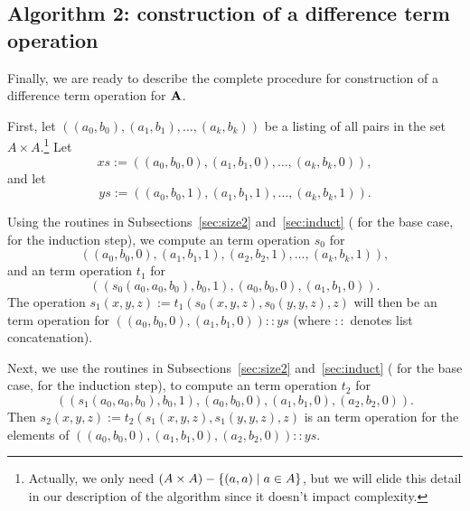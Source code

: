 \subsection{Algorithm 2: construction of a difference term operation}
\label{sec:algor-2}
Finally, we are ready to describe the complete procedure for construction
of a difference term operation for $\mathbf{A}$.  

First, let 
$((a_0, b_0), (a_1, b_1), \dots, (a_k, b_k))$ 
be a listing of all pairs in the set $A\times A$.\footnote{Actually, we only need
$(A \times A) - \{(a,a) \mid a \in A\}$, but we will elide this
detail in our description of the algorithm since it doesn't impact 
complexity.}
Let 
\begin{equation*}
xs := %
((a_0, b_0, 0), (a_1, b_1, 0), \dots, (a_k, b_k, 0)), 
\end{equation*}
and let 
\begin{equation*}
ys := %
((a_0, b_0, 1), (a_1, b_1, 1), \dots, (a_k, b_k, 1)). 
\end{equation*}

Using the routines in Subsections~\ref{sec:size2}
and~\ref{sec:induct} 
( for the base case,  for the induction step),
we compute an \ld term operation $s_0$ for
\begin{equation*}
((a_0, b_0, 0), (a_1, b_1, 1), (a_2, b_2, 1), \dots, (a_k, b_k, 1)),  
\end{equation*}
and an \ld term operation $t_1$ for
\begin{equation*}
((s_0(a_0, a_0, b_0), b_0, 1), (a_0, b_0, 0),(a_1, b_1, 0)). 
\end{equation*}
The operation $s_1(x,y,z) := t_1(s_0(x,y,z), s_0(y,y,z), z)$ will then be
an \ld term operation for
$((a_0, b_0, 0), (a_1, b_1, 0)) :: ys$  (where $::$ denotes
list concatenation).

Next, we use the routines in Subsections~\ref{sec:size2}
and~\ref{sec:induct} 
( for the base case,  for the induction step),
to compute an \ld term operation $t_2$ for
\begin{equation*}
((s_1(a_0, a_0, b_0), b_0, 1), (a_0, b_0, 0),(a_1, b_1, 0),(a_2, b_2, 0)). 
\end{equation*}
Then $s_2(x,y,z) := t_2(s_1(x,y,z), s_1(y,y,z), z)$ is an \ld term operation
for the elements of
$((a_0, b_0, 0), (a_1, b_1, 0), (a_2, b_2, 0)) :: ys$.

